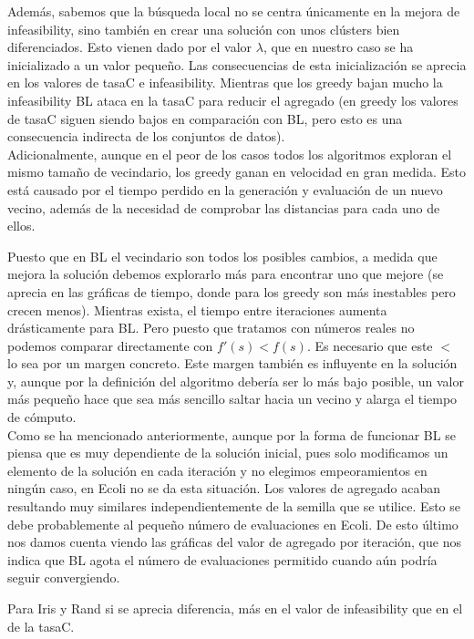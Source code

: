 Además, sabemos que la búsqueda local no se centra únicamente en la mejora de infeasibility, sino también en crear una solución con unos clústers bien diferenciados. Esto vienen dado por el valor $\lambda$, que en nuestro caso se ha inicializado a un valor pequeño. Las consecuencias de esta inicialización se aprecia en los valores de tasaC e infeasibility. Mientras que los greedy bajan mucho la infeasibility BL ataca en la tasaC para reducir el agregado (en greedy los valores de tasaC siguen siendo bajos en comparación con BL, pero esto es una consecuencia indirecta de los conjuntos de datos). \\

Adicionalmente, aunque en el peor de los casos todos los algoritmos exploran el mismo tamaño de vecindario, los greedy ganan en velocidad en gran medida. Esto está causado por el tiempo perdido en la generación y evaluación de un nuevo vecino, además de la necesidad de comprobar las distancias para cada uno de ellos.

Puesto que en BL el vecindario son todos los posibles cambios, a medida que mejora la solución debemos explorarlo más para encontrar uno que mejore (se aprecia en las gráficas de tiempo, donde para los greedy son más inestables pero crecen menos). Mientras exista, el tiempo entre iteraciones aumenta drásticamente para BL. Pero puesto que tratamos con números reales no podemos comparar directamente con $f'(s) < f(s)$. Es necesario que este $<$ lo sea por un margen concreto. Este margen también es influyente en la solución y, aunque por la definición del algoritmo debería ser lo más bajo posible, un valor más pequeño hace que sea más sencillo saltar hacia un vecino y alarga el tiempo de cómputo. \\

Como se ha mencionado anteriormente, aunque por la forma de funcionar BL se piensa que es muy dependiente de la solución inicial, pues solo modificamos un elemento de la solución en cada iteración y no elegimos empeoramientos en ningún caso, en Ecoli no se da esta situación. Los valores de agregado acaban resultando muy similares independientemente de la semilla que se utilice. Esto se debe probablemente al pequeño número de evaluaciones en Ecoli. De esto último nos damos cuenta viendo las gráficas del valor de agregado por iteración, que nos indica que BL agota el número de evaluaciones permitido cuando aún podría seguir convergiendo. 

Para Iris y Rand si se aprecia diferencia, más en el valor de infeasibility que en el de la tasaC.

